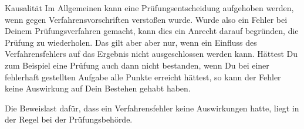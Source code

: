 \begin{artikel}{Kausalität}
Im Allgemeinen kann eine Prüfungsentscheidung aufgehoben werden, wenn gegen Verfahrensvorschriften verstoßen wurde. Wurde also ein Fehler bei Deinem Prüfungsverfahren gemacht, kann dies ein Anrecht darauf begründen, die Prüfung zu wiederholen. Das gilt aber aber nur, wenn ein Einfluss des Verfahrensfehlers auf das Ergebnis nicht ausgeschlossen werden kann. Hättest Du zum Beispiel eine Prüfung auch dann nicht bestanden, wenn Du bei einer fehlerhaft gestellten Aufgabe alle Punkte erreicht hättest, so kann der Fehler keine Auswirkung auf Dein Bestehen gehabt haben.

Die Beweislast dafür, dass ein Verfahrensfehler keine Auswirkungen hatte, liegt in der Regel bei der Prüfungsbehörde.
\end{artikel}
